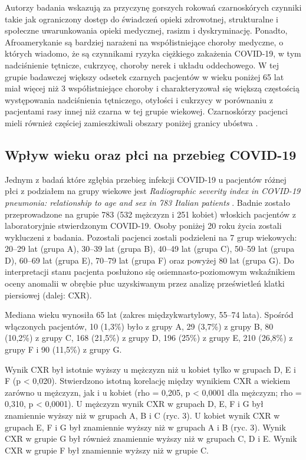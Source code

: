 \documentclass[polish, twoside, 12pt, a4paper]{article}
\theoremstyle{definition}
\theoremstyle{plain}
\theoremstyle{remark}
\begin{document}
Autorzy badania wskazują za przyczynę gorszych rokowań czarnoskórych czynniki takie jak ograniczony dostęp do świadczeń opieki zdrowotnej, strukturalne i społeczne uwarunkowania opieki medycznej, rasizm i dyskryminację. Ponadto, Afroamerykanie są bardziej narażeni na współistniejące choroby medyczne, o których wiadomo, że są czynnikami ryzyka ciężkiego zakażenia COVID-19, w tym nadciśnienie tętnicze, cukrzycę, choroby nerek i układu oddechowego. W tej grupie badawczej większy odsetek czarnych pacjentów w wieku poniżej 65 lat miał więcej niż 3 współistniejące choroby i charakteryzował się większą częstością występowania nadciśnienia tętniczego, otyłości i cukrzycy w porównaniu z pacjentami rasy innej niż czarna w tej grupie wiekowej. Czarnoskórzy pacjenci mieli również częściej zamieszkiwali obszary poniżej granicy ubóstwa \citep{borghesi2020}.

\subsection{Wpływ wieku oraz płci na przebieg COVID-19}

Jednym z badań które zgłębia przebieg infekcji COVID-19 u pacjentów różnej płci z podziałem na grupy wiekowe jest \emph{Radiographic severity index in COVID-19 pneumonia: relationship to age and sex in 783 Italian patients} \citep{wang2020}. Badnie zostało przeprowadzone na grupie 783 (532 mężczyzn i 251 kobiet) włoskich pacjentów z laboratoryjnie stwierdzonym COVID-19. Osoby poniżej 20 roku życia zostali wykluczeni z badania. Pozostali pacjenci zostali podzieleni na 7 grup wiekowych: 20--29 lat (grupa A), 30--39 lat (grupa B), 40--49 lat (grupa C), 50--59 lat (grupa D), 60--69 lat (grupa E), 70--79 lat (grupa F) oraz powyżej 80 lat (grupa G). Do interpretacji stanu pacjenta posłużono się osiemnasto-poziomowym wskaźnikiem oceny anomalii  w obrębie płuc uzyskiwanym przez analizę prześwietleń klatki piersiowej (dalej: CXR).

Mediana wieku wynosiła 65 lat (zakres międzykwartylowy, 55--74 lata). Spośród włączonych pacjentów, 10 (1,3\%) było z grupy A, 29 (3,7\%) z grupy B, 80 (10,2\%) z grupy C, 168 (21,5\%) z grupy D, 196 (25\%) z grupy E, 210 (26,8\%) z grupy F i 90 (11,5\%) z grupy G.

Wynik CXR był istotnie wyższy u mężczyzn niż u kobiet tylko w grupach D, E i F (p < 0,020). Stwierdzono istotną korelację między wynikiem CXR a wiekiem zarówno u mężczyzn, jak i u kobiet (rho = 0,205, p < 0,0001 dla mężczyzn; rho = 0,310, p < 0,0001). U mężczyzn wynik CXR w grupach D, E, F i G był znamiennie wyższy niż w grupach A, B i C (ryc. 3). U kobiet wynik CXR w grupach E, F i G był znamiennie wyższy niż w grupach A i B (ryc. 3). Wynik CXR w grupie G był również znamiennie wyższy niż w grupach C, D i E. Wynik CXR w grupie F był znamiennie wyższy niż w grupie C.
\end{document}
